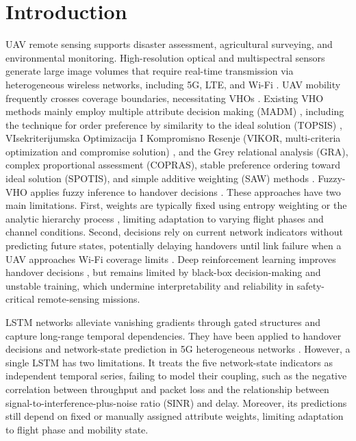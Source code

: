 \documentclass[remotesensing,article,submit,moreauthors]{Definitions/mdpi}
\begin{document}
\section{Introduction}\label{sec:intro}

UAV remote sensing supports disaster assessment, agricultural surveying, and environmental monitoring. High-resolution optical and multispectral sensors generate large image volumes that require real-time transmission via heterogeneous wireless networks, including 5G, LTE, and Wi-Fi \citep{ref1,ref2,ref3}. UAV mobility frequently crosses coverage boundaries, necessitating VHOs \citep{ref4,ref5,ref6}. Existing VHO methods mainly employ multiple attribute decision making (MADM) \citep{ref7}, including the technique for order preference by similarity to the ideal solution (TOPSIS) \citep{ref8,ref9,ref10}, VIsekriterijumska Optimizacija I Kompromisno Resenje (VIKOR, multi-criteria optimization and compromise solution) \citep{ref11}, and the Grey relational analysis (GRA), complex proportional assessment (COPRAS), stable preference ordering toward ideal solution (SPOTIS), and simple additive weighting (SAW) methods \citep{ref12}. Fuzzy-VHO applies fuzzy inference to handover decisions \citep{ref4}. These approaches have two main limitations. First, weights are typically fixed using entropy weighting or the analytic hierarchy process \citep{ref12,ref13,ref14,ref15}, limiting adaptation to varying flight phases and channel conditions. Second, decisions rely on current network indicators without predicting future states, potentially delaying handovers until link failure when a UAV approaches Wi-Fi coverage limits \citep{ref16,ref17}. Deep reinforcement learning improves handover decisions \citep{ref16,ref17,ref18}, but remains limited by black-box decision-making and unstable training, which undermine interpretability and reliability in safety-critical remote-sensing missions.

LSTM networks alleviate vanishing gradients through gated structures \citep{ref19} and capture long-range temporal dependencies. They have been applied to handover decisions and network-state prediction in 5G heterogeneous networks \citep{ref20,ref21,ref22}. However, a single LSTM has two limitations. It treats the five network-state indicators as independent temporal series, failing to model their coupling, such as the negative correlation between throughput and packet loss and the relationship between signal-to-interference-plus-noise ratio (SINR) and delay. Moreover, its predictions still depend on fixed or manually assigned attribute weights, limiting adaptation to flight phase and mobility state.
\end{document}
